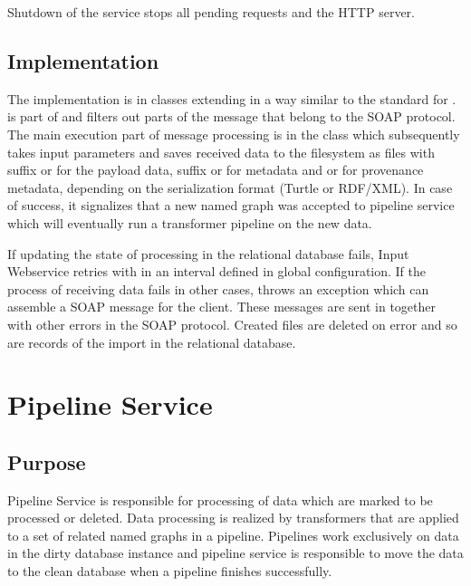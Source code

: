 Shutdown of the service stops all pending requests and the HTTP server.

\subsection{Implementation}
The implementation is in classes  extending  in a way similar to the standard  for .  is part of  and filters out parts of the message that belong to the SOAP protocol. The main execution part of message processing is in the  class which subsequently takes input parameters and saves received data to the filesystem as files with suffix  or  for the payload data, suffix  or  for metadata and  or  for provenance metadata, depending on the serialization format (Turtle or RDF/XML). In case of success, it signalizes that a new named graph was accepted to pipeline service which will eventually run a transformer pipeline on the new data.

If updating the state of processing in the relational database fails, Input Webservice retries with in an interval defined in global configuration. If the process of receiving data fails in other cases,  throws an  exception which can assemble a  SOAP message for the client. These messages are sent in  together with other errors in the SOAP protocol. Created files are deleted on error and so are records of the import in the relational database. 


\section{Pipeline Service}
\subsection{Purpose}
Pipeline Service is responsible for processing of data which are marked to be processed or deleted. Data processing is realized by transformers that are applied to a set of related named graphs in a pipeline. Pipelines work exclusively on data in the dirty database instance and pipeline service is responsible to move the data to the clean database when a pipeline finishes successfully.

